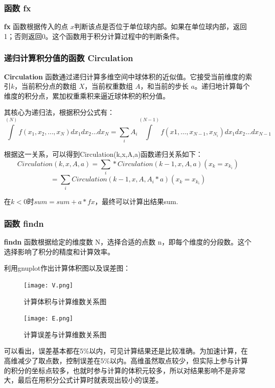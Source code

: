 \documentclass[UTF8]{ctexart}
\begin{document}
    \subsubsection{函数 fx}
    \textbf{fx} 函数根据传入的点 $x $判断该点是否位于单位球内部。如果在单位球内部，返回1；否则返回0。这个函数用于积分计算过程中的判断条件。

    \subsubsection{递归计算积分值的函数 Circulation}

    \textbf{Circulation} 函数通过递归计算多维空间中球体积的近似值。它接受当前维度的索引$ k$，当前积分点的数组 $X$，当前权重数组 $A$，和当前的步长 $a$。递归地计算每个维度的积分点，累加权重乘积来逼近球体积的积分值。

    其核心为递归法，根据积分公式有：
    \[\overset{(N)}{\int}f(x_1,x_2,\dots,x_N)dx_1 dx_2 \dots dx_N=\sum_{i}A_i\overset{(N-1)}{\int}f(x1,\dots,x_{N-1},x_{N_i})dx_1dx_2\dots dx_{N-1}\]

    根据这一关系，可以得到Circulation(k,x,A,a)函数递归关系如下：
    \[Circulation(k, x, A, a) = \sum_{i}*Circulation(k-1, x, A, a)(x_k=x_{k_{i}})\]
    \[=\sum_{i}Circulation(k-1, x, A, A_i * a)(x_k=x_{k_{i}})\]

    在$k<0$时$sum=sum+a*fx$，最终可以计算出结果sum.
    \subsubsection{函数 findn}
    \textbf{findn} 函数根据给定的维度数 N，选择合适的点数 n，即每个维度的分段数。这个选择影响了积分的精度和计算效率。

    利用gnuplot作出计算体积图以及误差图：

    \begin{figure}[htbp]
        \centering
        \texttt{[image: V.png]}
        \caption{计算体积与计算维数关系图}
    \end{figure}

    \begin{figure}[htbp]
        \centering
        \texttt{[image: E.png]}
        \caption{计算误差与计算维数关系图}
    \end{figure}

    可以看出，误差基本都在5\%以内，可见计算结果还是比较准确。为加速计算，在高维减少了取点数，控制误差在5\%以内。高维虽然取点较少，但实际上参与计算的积分的坐标点较多，也就时参与计算的体积元较多，所以对结果影响不是非常大，最后在用积分公式计算时就表现出较小的误差。
\end{document}
